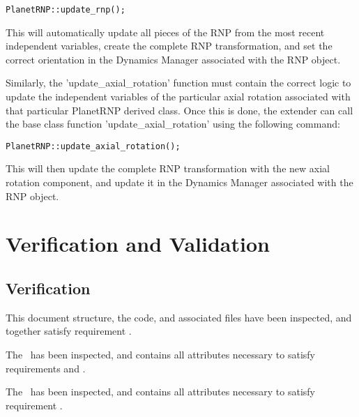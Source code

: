 \begin{verbatim}
PlanetRNP::update_rnp();
\end{verbatim}

This will automatically update all pieces of the RNP from the most recent
independent variables, create the complete RNP transformation, and set the
correct
orientation in the Dynamics Manager associated with the RNP object.

Similarly, the 'update\_axial\_rotation' function must contain the correct
logic to update the independent variables of the particular axial rotation
associated with that particular PlanetRNP derived class. Once this is done,
the extender can call the base class function 'update\_axial\_rotation'
using the following command:

\begin{verbatim}
PlanetRNP::update_axial_rotation();
\end{verbatim}

This will then update the complete RNP transformation with the
new axial rotation component, and update it in the
Dynamics Manager associated with the RNP object.


\chapter{Verification and Validation}\label{ch:ivv}

\section{Verification}
\label{inspect:TLI}
This document structure, the code, and associated files have been inspected,
and together satisfy requirement .

\label{inspect:data}
The \ModelDesc\ has been inspected, and contains all attributes necessary to
satisfy requirements  and
.

\label{inspect:func}
The \ModelDesc\ has been inspected, and contains all attributes necessary to
satisfy requirement .

